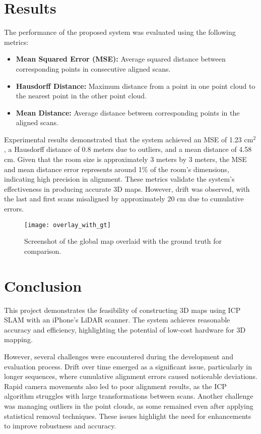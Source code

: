 \documentclass[conference]{IEEEtran}
\begin{document}
    \section{Results}
    The performance of the proposed system was evaluated using the following metrics:
    \begin{itemize}
        \item \textbf{Mean Squared Error (MSE):} Average squared distance between corresponding points in consecutive aligned scans.
        \item \textbf{Hausdorff Distance:} Maximum distance from a point in one point cloud to the nearest point in the other point cloud.
        \item \textbf{Mean Distance:} Average distance between corresponding points in the aligned scans.
    \end{itemize}

    Experimental results demonstrated that the system achieved an MSE of 1.23 cm$^2$
    , a Hausdorff distance of 0.8 meters due to outliers, and a mean distance of 4.58 cm.
    Given that the room size is approximately 3 meters by 3 meters, the MSE and mean distance error
    represents around 1\% of the room's dimensions, indicating high precision in alignment.
    These metrics validate the system's effectiveness in producing accurate 3D maps.
    However, drift was observed, with the last and first scans misaligned by approximately 20 cm
    due to cumulative errors.

    \begin{figure}[htbp]
        \centering
        \texttt{[image: overlay\_with\_gt]}
        \caption{Screenshot of the global map overlaid with the ground truth for comparison.}
        \label{fig:overlay_screenshot}
    \end{figure}

    \section{Conclusion}
    This project demonstrates the feasibility of constructing 3D maps using ICP SLAM with an iPhone's LiDAR scanner.
    The system achieves reasonable accuracy and efficiency, highlighting the potential of
    low-cost hardware for 3D mapping.

    However, several challenges were encountered during the development and evaluation process.
    Drift over time emerged as a significant issue, particularly in longer sequences,
    where cumulative alignment errors caused noticeable deviations.
    Rapid camera movements also led to poor alignment results, as the ICP algorithm struggles
    with large transformations between scans.
    Another challenge was managing outliers in the point clouds, as some remained even after
    applying statistical removal techniques.
    These issues highlight the need for enhancements to improve robustness and accuracy.
\end{document}
